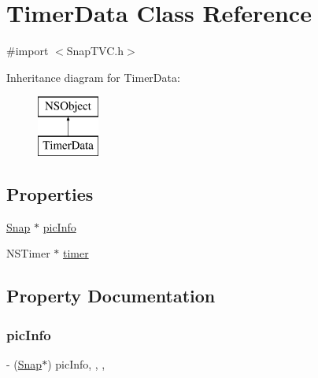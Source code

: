 \hypertarget{interface_timer_data}{}\section{Timer\+Data Class Reference}
\label{interface_timer_data}


{\ttfamily \#import $<$Snap\+T\+V\+C.\+h$>$}

Inheritance diagram for Timer\+Data\+:\begin{figure}[H]
\begin{center}
\leavevmode
\includegraphics[height=2.000000cm]{interface_timer_data}
\end{center}
\end{figure}
\subsection*{Properties}
\begin{DoxyCompactItemize}
\item 
\hyperlink{interface_snap}{Snap} $\ast$ \hyperlink{interface_timer_data_a4bbf1536211a2b611a04c337ba783e7d}{pic\+Info}
\item 
N\+S\+Timer $\ast$ \hyperlink{interface_timer_data_a69299843dbc3bbb45e61fc0810169638}{timer}
\end{DoxyCompactItemize}


\subsection{Property Documentation}
\hypertarget{interface_timer_data_a4bbf1536211a2b611a04c337ba783e7d}{}\label{interface_timer_data_a4bbf1536211a2b611a04c337ba783e7d} 
\subsubsection{\texorpdfstring{pic\+Info}{picInfo}}
{\footnotesize\ttfamily -\/ (\hyperlink{interface_snap}{Snap}$\ast$) pic\+Info\hspace{0.3cm}{\ttfamily [read]}, {\ttfamily [write]}, {\ttfamily [nonatomic]}, {\ttfamily [retain]}}

\hypertarget{interface_timer_data_a69299843dbc3bbb45e61fc0810169638}{}\label{interface_timer_data_a69299843dbc3bbb45e61fc0810169638} 
